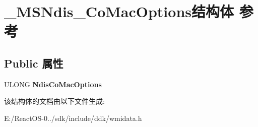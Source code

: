 \hypertarget{struct___m_s_ndis___co_mac_options}{}\section{\+\_\+\+M\+S\+Ndis\+\_\+\+Co\+Mac\+Options结构体 参考}
\label{struct___m_s_ndis___co_mac_options}
\subsection*{Public 属性}
\begin{DoxyCompactItemize}
\item 
\mbox{\label{struct___m_s_ndis___co_mac_options_a853a8f3e8a90ea69b09200a69c8af41c}} 
U\+L\+O\+NG {\bfseries Ndis\+Co\+Mac\+Options}
\end{DoxyCompactItemize}


该结构体的文档由以下文件生成\+:\begin{DoxyCompactItemize}
\item 
E\+:/\+React\+O\+S-\/0../sdk/include/ddk/wmidata.\+h\end{DoxyCompactItemize}
